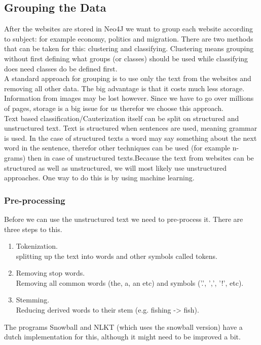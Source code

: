 \subsection{Grouping the Data}
After the websites are stored in Neo4J we want to group each website according to subject: for example economy, politics and migration. There are two methods that can be taken for this: clustering and classifying. Clustering means grouping without first defining what groups (or classes) should be used while classifying does need classes do be defined first. \\
A standard approach for grouping is to use only the text from the websites and removing all other data. The big advantage is that it costs much less storage. Information from images may be lost however. Since we have to go over millions of pages, storage is a big issue for us therefor we choose this approach. \\
Text based classification/Cauterization itself can be split on structured and unstructured text. Text is structured when sentences are used, meaning grammar is used. In the case of structured texts a word may say something about the next word in the sentence, therefor other techniques can be used (for example n-grams) then in case of unstructured texts.Because the text from websites can be structured as well as unstructured, we will most likely use unstructured approaches. One way to do this is by using machine learning.

\subsubsection{Pre-processing}
Before we can use the unstructured text we need to pre-process it. There are three steps to this. 
\begin{enumerate}
\item Tokenization. \\ splitting up the text into words and other symbols called tokens.
\item Removing stop words. \\ Removing all common words (the, a, an etc) and symbols ('.', ',', '!', etc). 
\item Stemming. \\ Reducing derived words to their stem (e.g. fishing -> fish).
\end{enumerate}
The programs Snowball \cite{snowball_dutch} and NLKT \cite{nlkt_stemming} (which uses the snowball version) have a dutch implementation for this, although it might need to be improved a bit.

